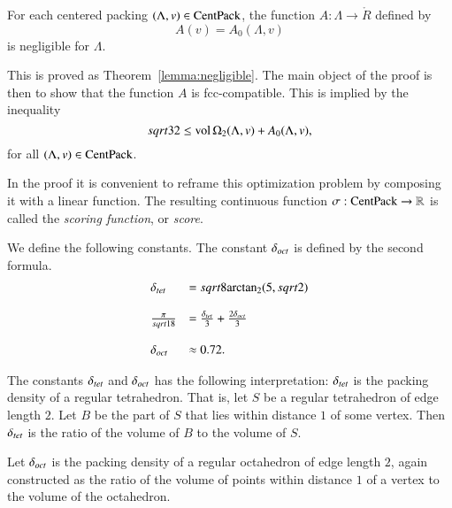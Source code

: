 \begin{theorem}\label{lemma:negligible'}
For each centered packing $(\Lambda,v)\in{\operatorname{CentPack}}$, the
function $A:\Lambda\to\ring{R}$ defined by
   $$A(v)= A_0(\Lambda,v)$$
is negligible for $\Lambda$.
\end{theorem}

This is proved as Theorem~\ref{lemma:negligible}.  The main object
of the proof is then to show that the function $A$ is
fcc-compatible. This is implied by the inequality
      \begin{equation}
      sqrt{32}\le{\operatorname{vol}}\,\Omega_2(\Lambda,v)+ A_0(\Lambda,v),
      \label{eqn:32}
      \end{equation}
for all $(\Lambda,v)\in{\operatorname{CentPack}}$.

In the proof it is convenient to reframe this optimization problem
by composing it with a linear function.  The resulting continuous
function $\sigma:{\operatorname{CentPack}}\to\mathbb{R}$ is called the
  {\it scoring function}, or {\it score}.

\begin{definition}[$\dtet$,~$\doct$]\label{def:dtet}  We define the following
constants.  The constant $\doct$ is defined by the second formula.
    $$\begin{array}{lll}
      \delta_{tet} &= sqrt{8} {\operatorname{arctan_2}}(5,sqrt{2})\\
      \\
      \frac{\pi}{sqrt{18}} &= \frac{\delta_{tet}}{3} + \frac{2
      \delta_{oct}}{3}\\
      \\
      \delta_{oct} & \approx 0.72.
      \end{array}
    $$
\end{definition}

\begin{remark}  The constants $\dtet$ and $\doct$ has the
following interpretation:  $\dtet$ is
the packing density of a regular tetrahedron. That is, let $S$ be
a regular tetrahedron of edge length $2$.  Let $B$ be the part of
$S$ that lies within distance $1$ of some vertex. Then $\dtet$ is
the ratio of the volume of $B$ to the volume of $S$.

Let $\doct$ is the packing density of a
regular octahedron of edge length $2$, again constructed as the
ratio of the volume of points within distance $1$ of a vertex to
the volume of the octahedron.
\end{remark}

